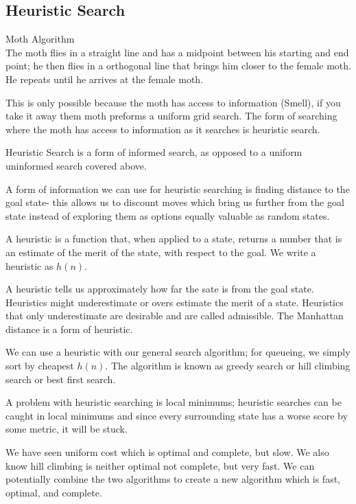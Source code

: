 \documentclass{chezarticle}
\begin{document}
\subsection{Heuristic Search}
\begin{algorithm}
Moth Algorithm\\
The moth flies in a straight line and has a midpoint between his starting and end point; he then flies in a orthogonal line that brings him closer to the female moth. He repeats until he arrives at the female moth. 
\end{algorithm}
This is only possible because the moth has access to information (Smell), if you take it away them moth preforms a uniform grid search. The form of searching where the moth has access to information as it searches is heuristic search.
\begin{definition}
Heuristic Search is a form of informed search, as opposed to a uniform uninformed search covered above.
\end{definition}
A form of information we can use for heuristic searching is finding distance to the goal state- this allows us to discount moves which bring us further from the goal state instead of exploring them as options equally valuable as random states.
\begin{definition}
A heuristic is a function that, when applied to a state, returns a number that is an estimate of the merit of the state, with respect to the goal. We write a heuristic as $h(n)$. 
\end{definition}
A heuristic tells us approximately how far the sate is from the goal state. Heuristics might underestimate or overs estimate the merit of a state. Heuristics that only underestimate are desirable and are called admissible. The Manhattan distance is a form of heuristic.
\begin{example}
We can use a heuristic with our general search algorithm; for queueing, we simply sort by cheapest $h(n)$. The algorithm is known as greedy search or hill climbing search or best first search. 
\end{example}
A problem with heuristic searching is local minimums; heuristic searches can be caught in local minimums and since every surrounding state has a worse score by some metric, it will be stuck. 
\begin{claim}
We have seen uniform cost which is optimal and complete, but slow. We also know hill climbing is neither optimal not complete, but very fast. We can potentially combine the two algorithms to create a new algorithm which is fast, optimal, and complete.
\end{claim}
\end{document}
